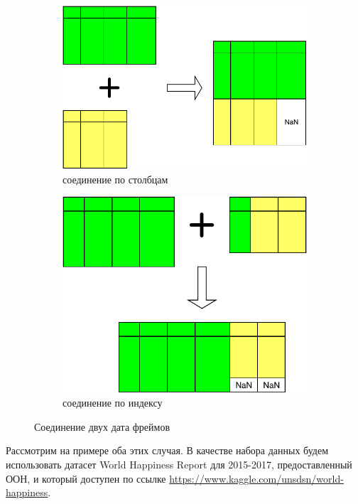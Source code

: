 \documentclass[a4paper,12pt]{article}
\begin{document}
\begin{figure}[h]
  \centering
  \begin{subfigure}[b]{0.45\textwidth}
    \centering
    \includegraphics[width=1\linewidth]{image/concat_vert.pdf}
    \caption{соединение по столбцам}
    \label{fig:concat_vert}
  \end{subfigure}
  \hfill
  \begin{subfigure}[b]{0.45\textwidth}
    \centering
    \includegraphics[width=0.85\linewidth]{image/concat_horz.pdf}
    \caption{соединение по индексу}
    \label{fig:concat_horz}
  \end{subfigure}  
  \caption{Соединение двух дата фреймов}
  \label{fig:concat}  
\end{figure}

Рассмотрим на примере оба этих случая. В качестве набора данных будем использовать датасет World Happiness Report для 2015-2017, предоставленный ООН, и который доступен по ссылке \url{https://www.kaggle.com/unsdsn/world-happiness}.
\end{document}
